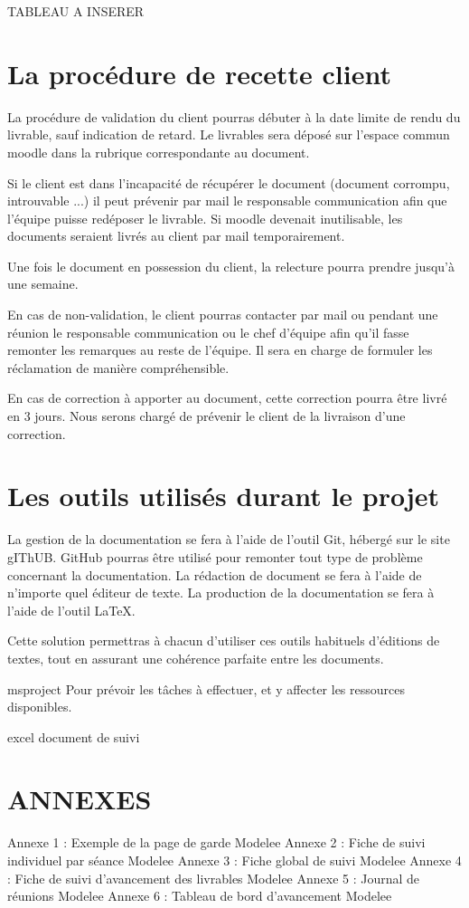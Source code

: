 TABLEAU A INSERER %


\section{La procédure de recette client}

La procédure de validation du client pourras débuter à la date limite de rendu du livrable, sauf indication de retard. Le livrables sera déposé sur l'espace commun moodle dans la rubrique correspondante au document.

Si le client est dans l’incapacité de récupérer le document (document corrompu, introuvable ...) il peut prévenir par mail le responsable communication afin que l’équipe puisse redéposer le livrable.
Si moodle devenait inutilisable, les documents seraient livrés au client par mail temporairement.

Une fois le document en possession du client, la relecture pourra prendre jusqu’à une semaine.

En cas de non-validation, le client pourras contacter par mail ou pendant une réunion le responsable communication ou le chef d’équipe afin qu’il fasse remonter les remarques au reste de l’équipe.
Il sera en charge de formuler les réclamation de manière compréhensible.

En cas de correction à apporter au document, cette correction pourra être livré en 3 jours.
Nous serons chargé de prévenir le client de la livraison d’une correction.

\section{Les outils utilisés durant le projet}

La gestion de la documentation se fera à l’aide de l’outil Git, hébergé sur le site gIThUB.
GitHub pourras être utilisé pour remonter tout type de problème concernant la documentation.
La rédaction de document se fera à l’aide de n’importe quel éditeur de texte.
La production de la documentation se fera à l’aide de l'outil LaTeX.

Cette solution permettras à chacun  d’utiliser ces outils habituels d’éditions de textes, tout en assurant une cohérence parfaite entre les documents.

msproject
Pour prévoir les tâches à effectuer, et y affecter les ressources disponibles.

excel document de suivi



\section{ANNEXES}
Annexe 1 : Exemple de la page de garde
    Modelee
Annexe 2 : Fiche de suivi individuel par séance
    Modelee
Annexe 3 : Fiche global de suivi
    Modelee
Annexe 4 : Fiche de suivi d'avancement des livrables
    Modelee
Annexe 5 : Journal de réunions
    Modelee
Annexe 6 : Tableau de bord d'avancement
    Modelee
